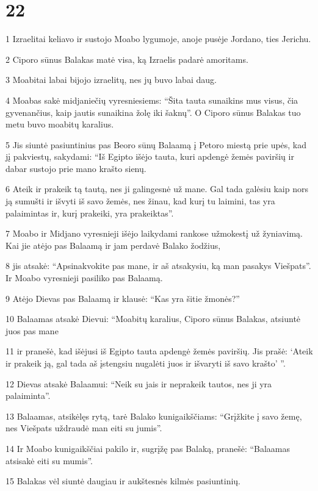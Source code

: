 \chapter{22}

\par 1 Izraelitai keliavo ir sustojo Moabo lygumoje, anoje pusėje Jordano, ties Jerichu. 
\par 2 Ciporo sūnus Balakas matė visa, ką Izraelis padarė amoritams. 
\par 3 Moabitai labai bijojo izraelitų, nes jų buvo labai daug. 
\par 4 Moabas sakė midjaniečių vyresniesiems: “Šita tauta sunaikins mus visus, čia gyvenančius, kaip jautis sunaikina žolę iki šaknų”. O Ciporo sūnus Balakas tuo metu buvo moabitų karalius. 
\par 5 Jis siuntė pasiuntinius pas Beoro sūnų Balaamą į Petoro miestą prie upės, kad jį pakviestų, sakydami: “Iš Egipto išėjo tauta, kuri apdengė žemės paviršių ir dabar sustojo prie mano krašto sienų. 
\par 6 Ateik ir prakeik tą tautą, nes ji galingesnė už mane. Gal tada galėsiu kaip nors ją sumušti ir išvyti iš savo žemės, nes žinau, kad kurį tu laimini, tas yra palaimintas ir, kurį prakeiki, yra prakeiktas”. 
\par 7 Moabo ir Midjano vyresnieji išėjo laikydami rankose užmokestį už žyniavimą. Kai jie atėjo pas Balaamą ir jam perdavė Balako žodžius, 
\par 8 jis atsakė: “Apsinakvokite pas mane, ir aš atsakysiu, ką man pasakys Viešpats”. Ir Moabo vyresnieji pasiliko pas Balaamą. 
\par 9 Atėjo Dievas pas Balaamą ir klausė: “Kas yra šitie žmonės?” 
\par 10 Balaamas atsakė Dievui: “Moabitų karalius, Ciporo sūnus Balakas, atsiuntė juos pas mane 
\par 11 ir pranešė, kad išėjusi iš Egipto tauta apdengė žemės paviršių. Jis prašė: ‘Ateik ir prakeik ją, gal tada aš įstengsiu nugalėti juos ir išvaryti iš savo krašto’ ”. 
\par 12 Dievas atsakė Balaamui: “Neik su jais ir neprakeik tautos, nes ji yra palaiminta”. 
\par 13 Balaamas, atsikėlęs rytą, tarė Balako kunigaikščiams: “Grįžkite į savo žemę, nes Viešpats uždraudė man eiti su jumis”. 
\par 14 Ir Moabo kunigaikščiai pakilo ir, sugrįžę pas Balaką, pranešė: “Balaamas atsisakė eiti su mumis”. 
\par 15 Balakas vėl siuntė daugiau ir aukštesnės kilmės pasiuntinių. 
